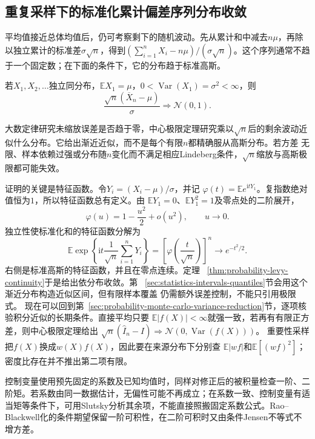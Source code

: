 \subsection{重复采样下的标准化累计偏差序列分布收敛}

平均值接近总体均值后，仍可考察剩下的随机波动。先从累计和中减去\(n\mu\)，再除以独立累计的标准差\(\sigma\sqrt n\)，得到\((\sum_{i=1}^nX_i-n\mu)/(\sigma\sqrt n)\)。这个序列通常不趋于一个固定数；在下面的条件下，它的分布趋于标准高斯。
\label{sec:rv-standardized-sum-limits}
\begin{theorem}
\label{thm:probability-iid-central-limit}
若\(X_1,X_2,\ldots\)独立同分布，\(\mathbb{E}X_1=\mu\)，\(0<\operatorname{Var}(X_1)=\sigma^2<\infty\)，则
\[ \frac{\sqrt{n}(\overline{X}_n-\mu)}{\sigma}
  \Rightarrow\mathcal{N}(0,1). \]
\end{theorem}

大数定律研究未缩放误差是否趋于零，中心极限定理研究乘以\(\sqrt{n}\)后的剩余波动近似什么分布。它给出渐近近似，而不是每个有限\(n\)都精确服从高斯分布。若方差
无限、样本依赖过强或分布随\(n\)变化而不满足相应Lindeberg条件，\(\sqrt{n}\)缩放与高斯极限都可能失效。

证明的关键是特征函数。令\(Y_i=(X_i-\mu)/\sigma\)，并记
\(\varphi(t)=\mathbb{E}e^{\mathrm{i}tY_1}\)。复指数绝对值恒为\(1\)，所以特征函数总有定义。由
\(\mathbb{E}Y_1=0\)、\(\mathbb{E}Y_1^2=1\)及零点处的二阶展开，
\[
  \varphi(u)=1-\frac{u^2}{2}+o(u^2),
  \qquad u\to0.
\]
独立性使标准化和的特征函数分解为
\[
  \mathbb{E}\exp\left\{
    \mathrm{i}t\frac{1}{\sqrt n}\sum_{i=1}^{n}Y_i
  \right\}
  =
  \left[\varphi\left(\frac{t}{\sqrt n}\right)\right]^n
  \longrightarrow e^{-t^2/2}.
\]
右侧是标准高斯的特征函数，并且在零点连续。定理
~\ref{thm:probability-levy-continuity}于是给出依分布收敛。第
~\ref{sec:statistics-intervals-quantiles}节会用这个渐近分布构造近似区间，但有限样本覆盖
仍需额外误差控制，不能只引用极限式。
现在可以回到第~\ref{sec:probability-monte-carlo-variance-reduction}节，逐项核验积分近似的长期条件。直接平均只要
\(\mathbb E|f(X)|<\infty\)就强一致，若再有有限正方差，则中心极限定理给出
\(\sqrt n(\widehat I_n-I)\Rightarrow\mathcal N(0,\operatorname{Var}(f(X)))\)。
重要性采样把\(f(X)\)换成\(w(X)f(X)\)，因此要在来源分布下分别查
\(\mathbb E|wf|\)和\(\mathbb E[(wf)^2]\)；密度比存在并不推出第二项有限。

控制变量使用预先固定的系数及已知均值时，同样对修正后的被积量检查一阶、二阶矩。若系数由同一数据估计，无偏性可能不再成立；在系数一致、控制变量有适当矩等条件下，可用Slutsky分析其余项，不能直接照搬固定系数公式。Rao--Blackwell化的条件期望保留一阶可积性，在二阶可积时又由条件Jensen不等式不增方差。

